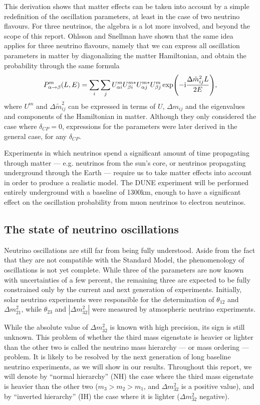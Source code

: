 This derivation shows that matter effects can be taken into account by a simple
redefinition of the oscillation parameters, at least in the case of two
neutrino flavours. For three neutrinos, the algebra is a lot more involved, and
beyond the scope of this report. Ohlsson and Snellman\cite{ohlsson} have
shown that the same idea applies for three neutrino flavours, namely that we can
express all oscillation parameters in matter by diagonalizing the matter
Hamiltonian, and obtain the probability through the same formula
\begin{equation}
	P^m_{\alpha \rightarrow \beta}(L, E) = \sum_i \sum_j U^m_{\alpha i}
	U^{m*}_{\beta i} U^{m*}_{\alpha j} U^m_{\beta j} \exp(-\mathrm{i} \frac{\Delta
	\tilde{m}^2_{ij} L}{2 E}),
\end{equation}
where $U^m$ and $\Delta \tilde{m}^2_{ij}$ can be expressed in terms of $U$,
$\Delta m_{ij}$ and the eigenvalues and components of the Hamiltonian in
matter. Although they only considered the case where $\delta_{CP}=0$,
expressions for the parameters were later derived\cite{kneller} in the general
case, for any $\delta_{CP}$.

Experiments in which neutrinos spend a significant amount of time propagating
through matter --- e.g. neutrinos from the sun's core, or neutrinos propagating
underground through the Earth --- require us to take matter effects into
account in order to produce a realistic model. The DUNE experiment will be
performed entirely underground with a baseline of 1300km, enough to have a
significant effect on the oscillation probability from muon neutrinos to
electron neutrinos. 


\subsection{The state of neutrino oscillations}\label{sec:state}
Neutrino oscillations are still far from being fully understood. Aside from the
fact that they are not compatible with the Standard Model, the phenomenology of
oscillations is not yet complete. While three of the parameters are now known
with uncertainties of a few percent, the remaining three are expected to
be fully constrained only by the current and next generation of experiments.
Initially, solar neutrino experiments were responsible for the determination of
$\theta_{12}$ and $\Delta m^2_{21}$, while $\theta_{23}$ and $|\Delta m^2_{32}|$
were measured by atmospheric neutrino experiments\cite{gonzalez-garcia}. 

While the absolute value of $\Delta m^2_{32}$ is known with high precision, its
sign is still unknown. This problem of whether the third mass eigenstate is
heavier or lighter than the other two is called the neutrino mass hierarchy ---
or mass ordering --- problem. It is likely to be resolved by the next
generation of long baseline neutrino experiments, as we will show in our results. 
Throughout this report, we will denote by ``normal hierarchy'' (NH) the case
where the third mass eigenstate is heavier than the other two ($m_3 > m_2 >
m_1$, and $\Delta m^2_{32}$ is a positive value), and by ``inverted hierarchy''
(IH) the case where it is lighter ($\Delta m^2_{32}$ negative).

